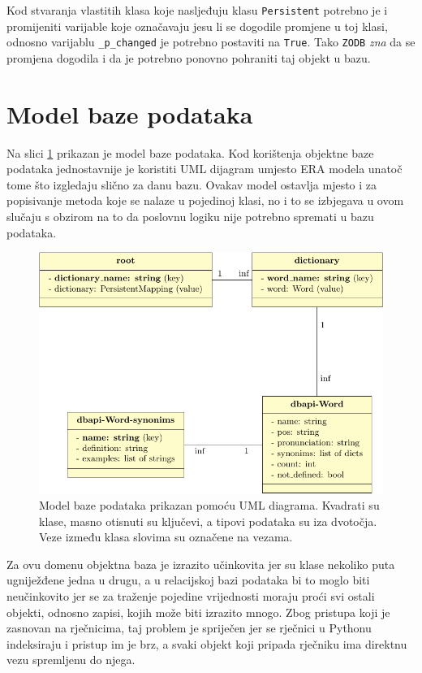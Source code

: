 \documentclass{foi}
\begin{document}
Kod stvaranja vlastitih klasa koje nasljeđuju klasu \texttt{Persistent}
potrebno je i promijeniti varijable koje označavaju jesu li se dogodile
promjene u toj klasi, odnosno varijablu \texttt{\_p\_changed} je potrebno
postaviti na \texttt{True}. Tako \texttt{ZODB} \textit{zna} da se promjena
dogodila i da je potrebno ponovno pohraniti taj objekt u bazu.

\section{Model baze podataka}

Na slici \ref{uml_db} prikazan je model baze podataka. Kod korištenja objektne
baze podataka jednostavnije je koristiti UML dijagram umjesto ERA modela unatoč
tome što izgledaju slično za danu bazu. Ovakav model ostavlja mjesto i za
popisivanje metoda koje se nalaze u pojedinoj klasi, no i to se izbjegava u
ovom slučaju s obzirom na to da poslovnu logiku nije potrebno spremati u bazu
podataka.

\begin{figure}
\centering
\includegraphics[scale=1]{uml_db.pdf}
\caption{Model baze podataka prikazan pomoću UML diagrama. Kvadrati su
	klase, masno otisnuti su ključevi, a tipovi podataka su iza dvotočja.
	Veze između klasa slovima su označene na vezama.}
\label{uml_db}
\end{figure}

Za ovu domenu objektna baza je izrazito učinkovita jer su klase nekoliko puta
ugniježđene jedna u drugu, a u relacijskoj bazi podataka bi to moglo biti
neučinkovito jer se za traženje pojedine vrijednosti moraju proći svi ostali
objekti, odnosno zapisi, kojih može biti izrazito mnogo. Zbog pristupa koji je
zasnovan na rječnicima, taj problem je spriječen jer se rječnici u Pythonu
indeksiraju i pristup im je brz, a svaki objekt koji pripada rječniku ima
direktnu vezu spremljenu do njega.
\end{document}
